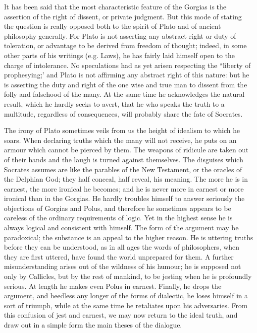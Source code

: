 \documentclass[11pt,letter]{article}
\begin{document}
\par  It has been said that the most characteristic feature of the Gorgias is the assertion of the right of dissent, or private judgment. But this mode of stating the question is really opposed both to the spirit of Plato and of ancient philosophy generally. For Plato is not asserting any abstract right or duty of toleration, or advantage to be derived from freedom of thought; indeed, in some other parts of his writings (e.g. Laws), he has fairly laid himself open to the charge of intolerance. No speculations had as yet arisen respecting the “liberty of prophesying;’ and Plato is not affirming any abstract right of this nature: but he is asserting the duty and right of the one wise and true man to dissent from the folly and falsehood of the many. At the same time he acknowledges the natural result, which he hardly seeks to avert, that he who speaks the truth to a multitude, regardless of consequences, will probably share the fate of Socrates.

\par  The irony of Plato sometimes veils from us the height of idealism to which he soars. When declaring truths which the many will not receive, he puts on an armour which cannot be pierced by them. The weapons of ridicule are taken out of their hands and the laugh is turned against themselves. The disguises which Socrates assumes are like the parables of the New Testament, or the oracles of the Delphian God; they half conceal, half reveal, his meaning. The more he is in earnest, the more ironical he becomes; and he is never more in earnest or more ironical than in the Gorgias. He hardly troubles himself to answer seriously the objections of Gorgias and Polus, and therefore he sometimes appears to be careless of the ordinary requirements of logic. Yet in the highest sense he is always logical and consistent with himself. The form of the argument may be paradoxical; the substance is an appeal to the higher reason. He is uttering truths before they can be understood, as in all ages the words of philosophers, when they are first uttered, have found the world unprepared for them. A further misunderstanding arises out of the wildness of his humour; he is supposed not only by Callicles, but by the rest of mankind, to be jesting when he is profoundly serious. At length he makes even Polus in earnest. Finally, he drops the argument, and heedless any longer of the forms of dialectic, he loses himself in a sort of triumph, while at the same time he retaliates upon his adversaries. From this confusion of jest and earnest, we may now return to the ideal truth, and draw out in a simple form the main theses of the dialogue.
\end{document}
